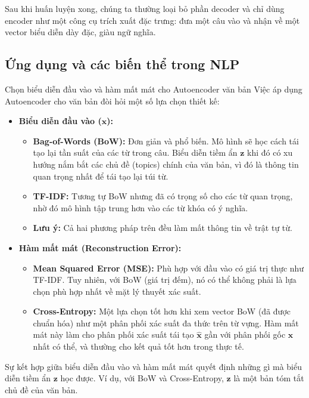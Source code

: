 Sau khi huấn luyện xong, chúng ta thường loại bỏ phần decoder và chỉ dùng encoder như một công cụ trích xuất đặc trưng: đưa một câu vào và nhận về một vector biểu diễn dày đặc, giàu ngữ nghĩa.

\subsection{Ứng dụng và các biến thể trong NLP}
\begin{deepdive}{Chọn biểu diễn đầu vào và hàm mất mát cho Autoencoder văn bản}
Việc áp dụng Autoencoder cho văn bản đòi hỏi một số lựa chọn thiết kế:
\begin{itemize}
    \item \textbf{Biểu diễn đầu vào ($\mathbf{x}$):}
    \begin{itemize}
        \item \textbf{Bag-of-Words (BoW):} Đơn giản và phổ biến. Mô hình sẽ học cách tái tạo lại tần suất của các từ trong câu. Biểu diễn tiềm ẩn $\mathbf{z}$ khi đó có xu hướng nắm bắt các chủ đề (topics) chính của văn bản, vì đó là thông tin quan trọng nhất để tái tạo lại túi từ.
        \item \textbf{TF-IDF:} Tương tự BoW nhưng đã có trọng số cho các từ quan trọng, nhờ đó mô hình tập trung hơn vào các từ khóa có ý nghĩa.
        \item \textbf{Lưu ý:} Cả hai phương pháp trên đều làm mất thông tin về trật tự từ.
    \end{itemize}
    \item \textbf{Hàm mất mát (Reconstruction Error):}
    \begin{itemize}
        \item \textbf{Mean Squared Error (MSE):} Phù hợp với đầu vào có giá trị thực như TF-IDF. Tuy nhiên, với BoW (giá trị đếm), nó có thể không phải là lựa chọn phù hợp nhất về mặt lý thuyết xác suất.
        \item \textbf{Cross-Entropy:} Một lựa chọn tốt hơn khi xem vector BoW (đã được chuẩn hóa) như một phân phối xác suất đa thức trên từ vựng. Hàm mất mát này làm cho phân phối xác suất tái tạo $\hat{\mathbf{x}}$ gần với phân phối gốc $\mathbf{x}$ nhất có thể, và thường cho kết quả tốt hơn trong thực tế.
    \end{itemize}
\end{itemize}
Sự kết hợp giữa biểu diễn đầu vào và hàm mất mát quyết định những gì mà biểu diễn tiềm ẩn $\mathbf{z}$ học được. Ví dụ, với BoW và Cross-Entropy, $\mathbf{z}$ là một bản tóm tắt chủ đề của văn bản.
\end{deepdive}
